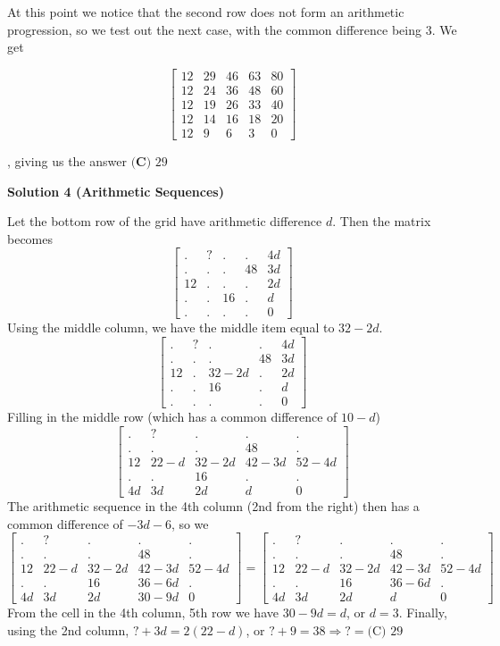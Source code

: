 \begin{enumerate}
 At this point we notice that the second row does not form an arithmetic progression, so we test out the next case, with the common difference being $3$. We get

 
 \[\begin{bmatrix} 12 & 29 &46&63&80 \\ 12&24&36&48&60\\ 12&19&26&33&40\\ 12&14&16&18&20\\ 12&9&6&3&0\end{bmatrix}\]

 , giving us the answer $\boxed{\textbf{(C) }29}$




\textbf{Solution 4 (Arithmetic Sequences)}

Let the bottom row of the grid have arithmetic difference $d$. Then the matrix becomes 
 \[\begin{bmatrix} . & ? &.&.&4d \\ .&.&.&48&3d\\ 12&.&.&.&2d\\ .&.&16&.&d\\ .&.&.&.&0\end{bmatrix}\]Using the middle column, we have the middle item equal to $32-2d$.
 \[\begin{bmatrix} . & ? &.&.&4d \\ .&.&.&48&3d\\ 12&.&32-2d&.&2d\\ .&.&16&.&d\\ .&.&.&.&0\end{bmatrix}\]Filling in the middle row (which has a common difference of $10-d$)
 \[\begin{bmatrix} . & ? &.&.&. \\ .&.&.&48&.\\ 12&22-d&32-2d&42-3d&52-4d\\ .&.&16&.&.\\ 4d&3d&2d&d&0\end{bmatrix}\]The arithmetic sequence in the 4th column (2nd from the right) then has a common difference of $-3d-6$, so we
 \[\begin{bmatrix} . & ? &.&.&. \\ .&.&.&48&.\\ 12&22-d&32-2d&42-3d&52-4d\\ .&.&16&36-6d&.\\ 4d&3d&2d&30-9d&0\end{bmatrix} = \begin{bmatrix} . & ? &.&.&. \\ .&.&.&48&.\\ 12&22-d&32-2d&42-3d&52-4d\\ .&.&16&36-6d&.\\ 4d&3d&2d&d&0\end{bmatrix}\]From the cell in the 4th column, 5th row we have $30-9d=d$, or $d=3$. Finally, using the 2nd column, $\text{?} + 3d = 2(22-d)$, or $\text{?}+9=38 \Rightarrow \text{?}=\boxed{\text{(C) }29}$





\end{enumerate}
